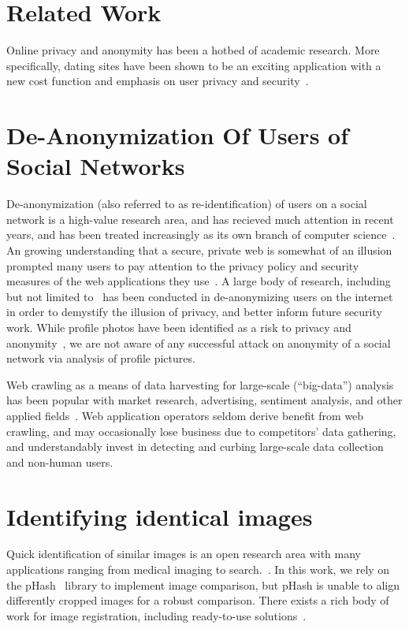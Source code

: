 \section{Related Work}
\label{sec:related}

Online privacy and anonymity has been a hotbed of academic research.
More specifically, dating sites have been shown to be an exciting application with a new cost function and emphasis on user privacy and security~\cite{okws}.


\section{De-Anonymization Of Users of Social Networks}
\label{sec:related_anon}

De-anonymization (also referred to as re-identification) of users on a social network is a high-value research area, and has recieved much attention in recent years, and has been treated increasingly as its own branch of computer science~\cite{reidentification1}.
An growing understanding that a secure, private web is somewhat of an illusion~\cite{webisnotsecure} prompted many users to pay attention to the privacy policy and security measures of the web applications they use~\cite{motivationforanonymity}.
A large body of research, including but not limited to~\cite{deanonsocial1,deanonsocial2,locationprivacy} has been conducted in de-anonymizing users on the internet in order to demystify the illusion of privacy, and better inform future security work.
While profile photos have been identified as a risk to privacy and anonymity~\cite{profilephotos1}, we are not aware of any successful attack on anonymity of a social network via analysis of profile pictures.

Web crawling as a means of data harvesting for large-scale (``big-data'') analysis has been popular with market research, advertising, sentiment analysis, and other applied fields~\cite{crawling1}.
Web application operators seldom derive benefit from web crawling, and may occasionally lose business due to competitors' data gathering, and understandably invest in detecting and curbing large-scale data collection~\cite{limitcrawling1, limitcrawling2, protectidentity1, protectidentity2} and non-human users.

\section{Identifying identical images}
\label{sec:related_images}


Quick identification of similar images is an open research area with many applications ranging from medical imaging to search.~\cite{nearduplicateimage1,nearduplicateimage2}. In this work, we rely on the pHash~\cite{phash} library to implement image comparison, but pHash is unable to align differently cropped images for a robust comparison. There exists a rich body of work for image registration, including ready-to-use solutions~\cite{registration3}.
